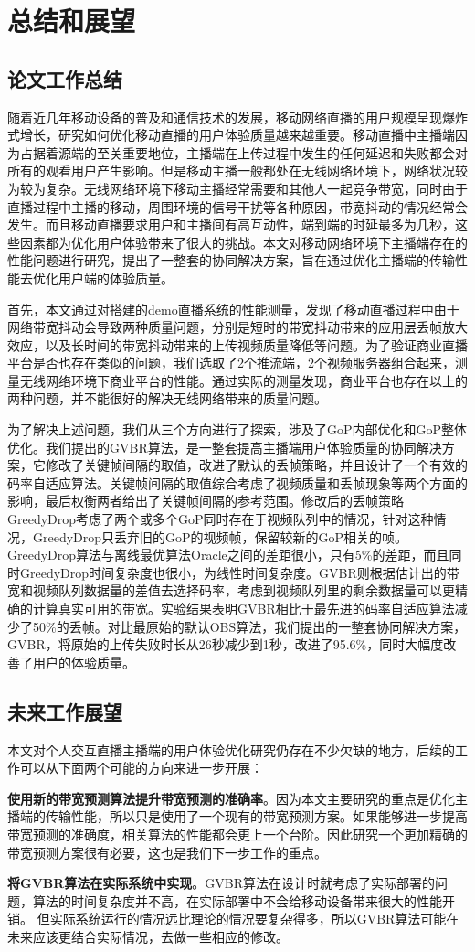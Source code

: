 \chapter{总结和展望}
\section{论文工作总结}
随着近几年移动设备的普及和通信技术的发展，移动网络直播的用户规模呈现爆炸式增长，研究如何优化移动直播的用户体验质量越来越重要。移动直播中主播端因为占据着源端的至关重要地位，主播端在上传过程中发生的任何延迟和失败都会对所有的观看用户产生影响。但是移动主播一般都处在无线网络环境下，网络状况较为较为复杂。无线网络环境下移动主播经常需要和其他人一起竞争带宽，同时由于直播过程中主播的移动，周围环境的信号干扰等各种原因，带宽抖动的情况经常会发生。而且移动直播要求用户和主播间有高互动性，端到端的时延最多为几秒，这些因素都为优化用户体验带来了很大的挑战。本文对移动网络环境下主播端存在的性能问题进行研究，提出了一整套的协同解决方案，旨在通过优化主播端的传输性能去优化用户端的体验质量。

首先，本文通过对搭建的demo直播系统的性能测量，发现了移动直播过程中由于网络带宽抖动会导致两种质量问题，分别是短时的带宽抖动带来的应用层丢帧放大效应，以及长时间的带宽抖动带来的上传视频质量降低等问题。为了验证商业直播平台是否也存在类似的问题，我们选取了2个推流端，2个视频服务器组合起来，测量无线网络环境下商业平台的性能。通过实际的测量发现，商业平台也存在以上的两种问题，并不能很好的解决无线网络带来的质量问题。

为了解决上述问题，我们从三个方向进行了探索，涉及了GoP内部优化和GoP整体优化。我们提出的GVBR算法，是一整套提高主播端用户体验质量的协同解决方案，它修改了关键帧间隔的取值，改进了默认的丢帧策略，并且设计了一个有效的码率自适应算法。关键帧间隔的取值综合考虑了视频质量和丢帧现象等两个方面的影响，最后权衡两者给出了关键帧间隔的参考范围。修改后的丢帧策略GreedyDrop考虑了两个或多个GoP同时存在于视频队列中的情况，针对这种情况，GreedyDrop只丢弃旧的GoP的视频帧，保留较新的GoP相关的帧。GreedyDrop算法与离线最优算法Oracle之间的差距很小，只有5\%的差距，而且同时GreedyDrop时间复杂度也很小，为线性时间复杂度。GVBR则根据估计出的带宽和视频队列数据量的差值去选择码率，考虑到视频队列里的剩余数据量可以更精确的计算真实可用的带宽。实验结果表明GVBR相比于最先进的码率自适应算法减少了50\%的丢帧。对比最原始的默认OBS算法，我们提出的一整套协同解决方案，GVBR，将原始的上传失败时长从26秒减少到1秒，改进了95.6\%，同时大幅度改善了用户的体验质量。

\section{未来工作展望}
本文对个人交互直播主播端的用户体验优化研究仍存在不少欠缺的地方，后续的工作可以从下面两个可能的方向来进一步开展：

\textbf{使用新的带宽预测算法提升带宽预测的准确率}。因为本文主要研究的重点是优化主播端的传输性能，所以只是使用了一个现有的带宽预测方案。如果能够进一步提高带宽预测的准确度，相关算法的性能都会更上一个台阶。因此研究一个更加精确的带宽预测方案很有必要，这也是我们下一步工作的重点。

\textbf{将GVBR算法在实际系统中实现}。GVBR算法在设计时就考虑了实际部署的问题，算法的时间复杂度并不高，在实际部署中不会给移动设备带来很大的性能开销。 但实际系统运行的情况远比理论的情况要复杂得多，所以GVBR算法可能在未来应该更结合实际情况，去做一些相应的修改。